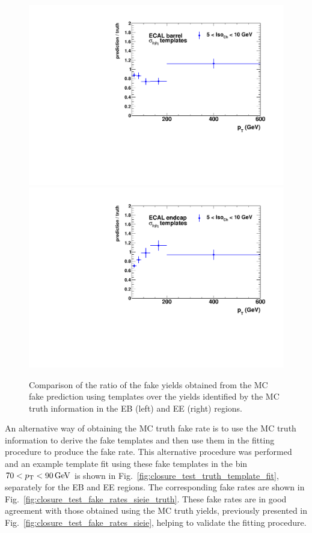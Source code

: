 \begin{figure}[!htbp]
  \centering
  \includegraphics[scale=0.40]{figures/closure_test_fake_rate_ratio_sieie_EB.pdf}
  \includegraphics[scale=0.40]{figures/closure_test_fake_rate_ratio_sieie_EE.pdf}
  \caption{Comparison of the ratio of the fake yields obtained from the MC fake prediction using \sieie templates over the yields identified by the MC truth information in the EB (left) and EE (right) regions.}
  \label{fig:closure_test_yields}
\end{figure}

An alternative way of obtaining the MC truth fake rate is to use the MC truth information to derive the fake templates and then use them in the fitting procedure to produce the fake rate. This alternative procedure was performed and an example template fit using these fake templates in the bin $70 < p_{\mathrm{T}} < 90\,\text{Ge\hspace{-.08em}V}$ is shown in Fig.~\ref{fig:closure_test_truth_template_fit}, separately for the EB and EE regions. The corresponding fake rates are shown in Fig.~\ref{fig:closure_test_fake_rates_sieie_truth}. These fake rates are in good agreement with those obtained using the MC truth yields, previously presented in Fig.~\ref{fig:closure_test_fake_rates_sieie}, helping to validate the fitting procedure.

